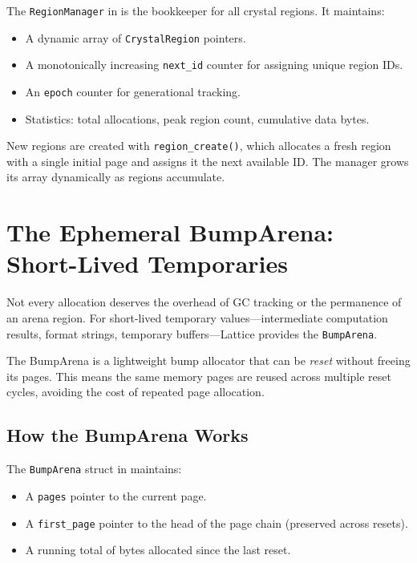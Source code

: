 The \lstinline|RegionManager| in  is the bookkeeper for all crystal regions.
It maintains:

\begin{itemize}
  \item A dynamic array of \lstinline|CrystalRegion| pointers.
  \item A monotonically increasing \lstinline|next_id| counter for assigning unique region IDs.
  \item An \lstinline|epoch| counter for generational tracking.
  \item Statistics: total allocations, peak region count, cumulative data bytes.
\end{itemize}

New regions are created with \lstinline|region_create()|, which allocates a fresh region with a single initial page and assigns it the next available ID.
The manager grows its array dynamically as regions accumulate.


\section{The Ephemeral BumpArena: Short-Lived Temporaries}\label{sec:bump-arena}


Not every allocation deserves the overhead of GC tracking or the permanence of an arena region.
For short-lived temporary values---intermediate computation results, format strings, temporary buffers---Lattice provides the \lstinline|BumpArena|.

The BumpArena is a lightweight bump allocator that can be \emph{reset} without freeing its pages.
This means the same memory pages are reused across multiple reset cycles, avoiding the cost of repeated page allocation.

\subsection{How the BumpArena Works}

The \lstinline|BumpArena| struct in  maintains:

\begin{itemize}
  \item A \lstinline|pages| pointer to the current page.
  \item A \lstinline|first_page| pointer to the head of the page chain (preserved across resets).
  \item A running total of bytes allocated since the last reset.
\end{itemize}

